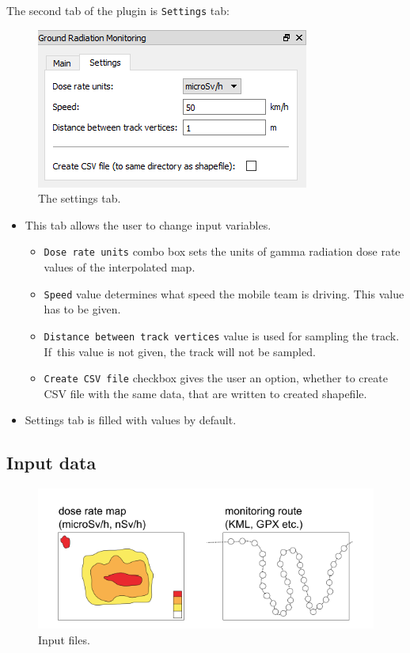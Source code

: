 The second tab of the plugin is \texttt{Settings} tab:

\begin{figure}[H]
\centering
\includegraphics{pictures/user_guide/gui_settings.png}
\caption{The settings tab.}
\end{figure}

\begin{itemize}
\item
  This tab allows the user to change input variables.

  \begin{itemize}
  
  \item
    \texttt{Dose\ rate\ units} combo box sets the units of gamma
    radiation dose rate values of the interpolated map.
  \item
    \texttt{Speed} value determines what speed the mobile team is
    driving. This value has to be given.
  \item
    \texttt{Distance\ between\ track\ vertices} value is used for
    sampling the track. If~this value is not given, the track will not
    be sampled.
  \item
    \texttt{Create\ CSV\ file} checkbox gives the user an option,
    whether to create CSV file with the same data, that are written to
    created shapefile.
  \end{itemize}
\item
  Settings tab is filled with values by default.
\end{itemize}

\subsection{Input data}\label{input-data}

\begin{figure}[H]
\centering
\includegraphics{pictures/user_guide/input.png}
\caption{Input files.}
\end{figure}

